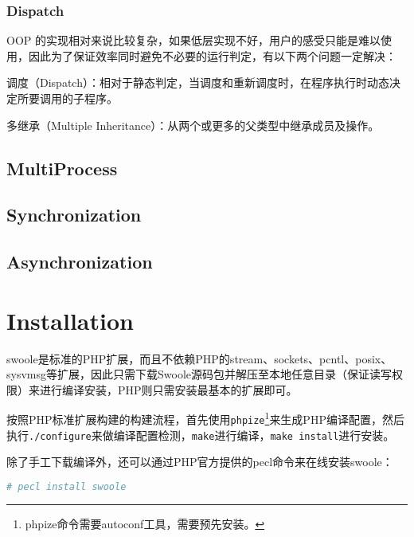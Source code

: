 \subsection{Dispatch}



OOP 的实现相对来说比较复杂，如果低层实现不好，用户的感受只能是难以使用，因此为了保证效率同时避免不必要的运行判定，有以下两个问题一定解决：

\begin{compactitem}
\item 调度（Dispatch）：相对于静态判定，当调度和重新调度时，在程序执行时动态决定所要调用的子程序。
\item 多继承（Multiple Inheritance）：从两个或更多的父类型中继承成员及操作。
\end{compactitem}



\section{MultiProcess}



\section{Synchronization}




\section{Asynchronization}






\chapter{Installation}

swoole是标准的PHP扩展，而且不依赖PHP的stream、sockets、pcntl、posix、sysvmsg等扩展，因此只需下载Swoole源码包并解压至本地任意目录（保证读写权限）来进行编译安装，PHP则只需安装最基本的扩展即可。

按照PHP标准扩展构建的构建流程，首先使用\texttt{phpize}\footnote{phpize命令需要autoconf工具，需要预先安装。}来生成PHP编译配置，然后执行\texttt{./configure}来做编译配置检测，\texttt{make}进行编译，\texttt{make install}进行安装。

除了手工下载编译外，还可以通过PHP官方提供的pecl命令来在线安装swoole：

\begin{lstlisting}[language=bash]
# pecl install swoole
\end{lstlisting}



